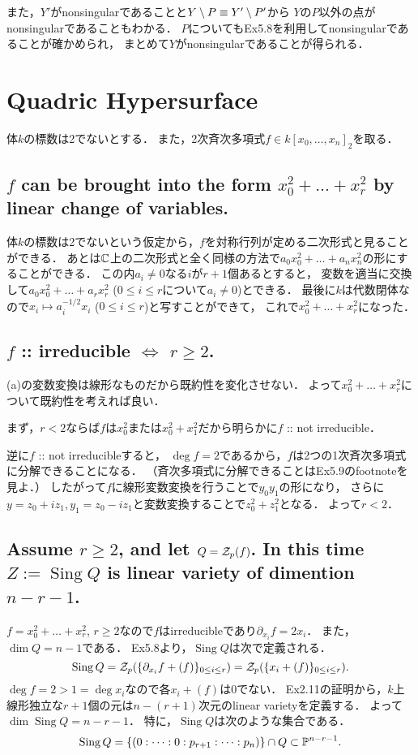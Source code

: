 \documentclass[a4paper]{jsarticle}
\newcommand{\Sing}{\operatorname{Sing}}
\begin{document}
	また，$Y'$がnonsingularであることと$Y \setminus P \equiv Y' \setminus P'$から
	$Y$の$P$以外の点がnonsingularであることもわかる．
	$P$についてもEx5.8を利用してnonsingularであることが確かめられ，
	まとめて$Y$がnonsingularであることが得られる．

\section{Quadric Hypersurface} %
	体$k$の標数は2でないとする．
	また，2次斉次多項式$f \in k[x_0, \dots, x_n]_2$を取る．

	\subsection{$f$ can be brought into the form $x_0^2+\dots+x_r^2$ by linear change of variables.}
	体$k$の標数は2でないという仮定から，$f$を対称行列が定める二次形式と見ることができる．
	あとは$\mathbb{C}$上の二次形式と全く同様の方法で$a_0 x_0^2+\dots+a_n x_n^2$の形にすることができる．
	この内$a_i \neq 0$なる$i$が$r+1$個あるとすると，
	変数を適当に交換して$a_0 x_0^2+\dots+a_r x_r^2$ ($0 \leq i \leq r$について$a_i \neq 0$)とできる．
	最後に$k$は代数閉体なので$x_i \mapsto a_i^{-1/2} x_i$ ($0 \leq i \leq r$)と写すことができて，
	これで$x_0^2+\dots+x_r^2$になった．

	\subsection{$f$ :: irreducible $\iff$ $r \geq 2$.}
	(a)の変数変換は線形なものだから既約性を変化させない．
	よって$x_0^2+\dots+x_r^2$について既約性を考えれば良い．

	まず，$r < 2$ならば$f$は$x_0^2$または$x_0^2+x_1^2$だから明らかに$f$ :: not irreducible．

	逆に$f$ :: not irreducibleすると，
	$\deg f=2$であるから，$f$は2つの1次斉次多項式に分解できることになる．
	（斉次多項式に分解できることはEx5.9のfootnoteを見よ．）
	したがって$f$に線形変数変換を行うことで$y_0 y_1$の形になり，
	さらに$y=z_0+iz_1, y_1=z_0-iz_1$と変数変換することで$z_0^2+z_1^2$となる．
	よって$r<2$．

	\subsection{Assume $r \geq 2$, and let $Q=\mathcal{Z}_p(f)$. In this time $Z:=\Sing Q$ is linear variety of dimention $n-r-1$.}
	$f=x_0^2+\dots+x_r^2$, $r \geq 2$なので$f$はirreducibleであり$\partial_{x_i}f=2x_i$．
	また，$\dim Q=n-1$である．
	Ex5.8より，$\Sing Q$は次で定義される．
	\[ \Sing Q=\zerosp(\{\partial_{x_i}f+(f)\}_{0 \leq i \leq r})=\zerosp(\{x_i+(f)\}_{0 \leq i \leq r}). \]
	$\deg f=2>1=\deg x_i$なので各$x_i+(f)$は0でない．
	Ex2.11の証明から，$k$上線形独立な$r+1$個の元は$n-(r+1)$次元のlinear varietyを定義する．
    よって$\dim \Sing Q=n-r-1$．
    特に，$\Sing Q$は次のような集合である．
    \[ \Sing Q=\{ (0:\dots:0:p_{r+1}:\dots:p_n) \} \cap Q \subset \proj^{n-r-1}. \]
	
\end{document}
